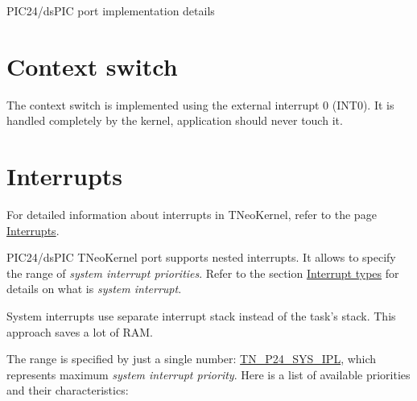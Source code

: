 P\+I\+C24/ds\+P\+I\+C port implementation details\hypertarget{pic24_details_pic24_context_switch}{}\section{Context switch}\label{pic24_details_pic24_context_switch}
The context switch is implemented using the external interrupt 0 ({\ttfamily I\+N\+T0}). It is handled completely by the kernel, application should never touch it.\hypertarget{pic24_details_pic24_interrupts}{}\section{Interrupts}\label{pic24_details_pic24_interrupts}
For detailed information about interrupts in T\+Neo\+Kernel, refer to the page \hyperlink{interrupts}{Interrupts}.

P\+I\+C24/ds\+P\+I\+C T\+Neo\+Kernel port supports nested interrupts. It allows to specify the range of {\itshape system interrupt priorities}. Refer to the section \hyperlink{interrupts_interrupt_types}{Interrupt types} for details on what is {\itshape system interrupt}.

System interrupts use separate interrupt stack instead of the task's stack. This approach saves a lot of R\+A\+M.

The range is specified by just a single number\+: {\ttfamily \hyperlink{tn__cfg__default_8h_a4feb7eb34fc2f175167b7496b63c398a}{T\+N\+\_\+\+P24\+\_\+\+S\+Y\+S\+\_\+\+I\+P\+L}}, which represents maximum {\itshape system interrupt priority}. Here is a list of available priorities and their characteristics\+:


